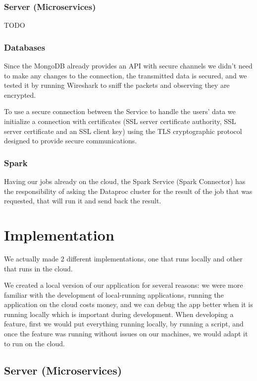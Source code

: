 \documentclass[oneside]{article}
\newcommand*\fpar{\hspace{1ex}}
\begin{document}
    \subsubsection{Server (Microservices)}
    \fpar TODO

    \subsubsection{Databases}
    \fpar Since the MongoDB already provides an API with secure channels we didn't need to make any changes to the connection, the transmitted data is secured, and we tested it by running Wireshark to sniff the packets and observing they are encrypted.
    \par To use a secure connection between the Service to handle the users' data we initialize a connection with certificates (SSL server certificate authority, SSL server certificate and an SSL client key) using the TLS cryptographic protocol designed to provide secure communications.

    \subsubsection{Spark}
    \fpar Having our jobs already on the cloud, the Spark Service (Spark Connector) has the responsibility of asking the Dataproc cluster for the result of the job that was requested, that will run it and send back the result.

\section{Implementation}
\label{sec:implementation}
\fpar We actually made 2 different implementations, one that runs locally and other that runs in the cloud.
\par We created a local version of our application for several reasons: we were more familiar with the development of local-running applications, running the application on the cloud costs money, and we can debug the app better when it is running locally which is important during development. When developing a feature, first we would put everything running locally, by running a script, and once the feature was running without issues on our machines, we would adapt it to run on the cloud.

  \subsection{Server (Microservices)}
\end{document}
